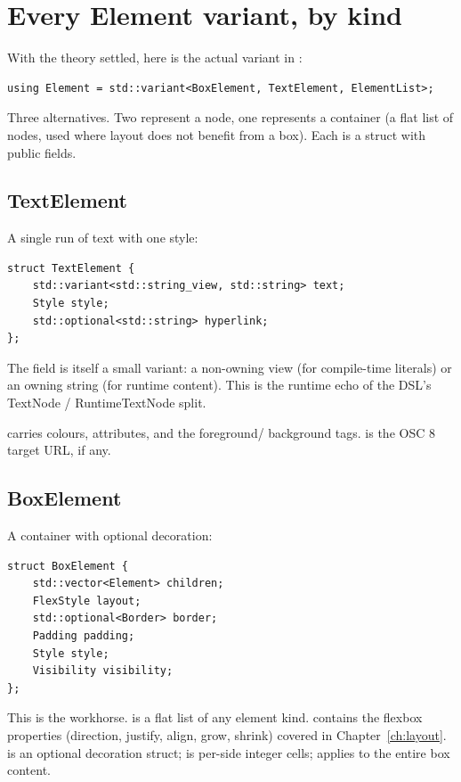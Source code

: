 \section{Every Element variant, by kind}

With the theory settled, here is the actual variant in
:

\begin{lstlisting}
using Element = std::variant<BoxElement, TextElement, ElementList>;
\end{lstlisting}

Three alternatives. Two represent a node, one represents a
container (a flat list of nodes, used where layout does not
benefit from a box). Each is a struct with public fields.

\subsection*{TextElement}

A single run of text with one style:

\begin{lstlisting}
struct TextElement {
    std::variant<std::string_view, std::string> text;
    Style style;
    std::optional<std::string> hyperlink;
};
\end{lstlisting}

The  field is itself a small variant: a non-owning view
(for compile-time literals) or an owning string (for runtime
content). This is the runtime echo of the DSL's TextNode /
RuntimeTextNode split.

 carries colours, attributes, and the foreground/
background tags.  is the OSC 8 target URL, if any.

\subsection*{BoxElement}

A container with optional decoration:

\begin{lstlisting}
struct BoxElement {
    std::vector<Element> children;
    FlexStyle layout;
    std::optional<Border> border;
    Padding padding;
    Style style;
    Visibility visibility;
};
\end{lstlisting}

This is the workhorse.  is a flat list of any
element kind.  contains the flexbox properties
(direction, justify, align, grow, shrink) covered in
Chapter~\ref{ch:layout}.  is an optional decoration
struct;  is per-side integer cells; 
applies to the entire box content.

